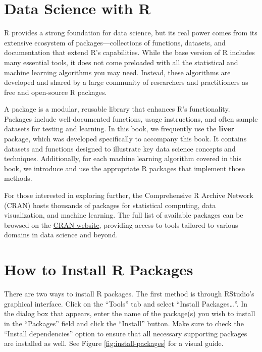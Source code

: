 \documentclass[
  11pt,
]{book}
\theoremstyle{definition}
\theoremstyle{definition}
\theoremstyle{definition}
\theoremstyle{definition}
\theoremstyle{remark}
\begin{document}
\section{Data Science with R}\label{data-science-with-r}

R provides a strong foundation for data science, but its real power comes from its extensive ecosystem of packages---collections of functions, datasets, and documentation that extend R's capabilities. While the base version of R includes many essential tools, it does not come preloaded with all the statistical and machine learning algorithms you may need. Instead, these algorithms are developed and shared by a large community of researchers and practitioners as free and open-source R packages.

A package is a modular, reusable library that enhances R's functionality. Packages include well-documented functions, usage instructions, and often sample datasets for testing and learning. In this book, we frequently use the \textbf{liver} package, which was developed specifically to accompany this book. It contains datasets and functions designed to illustrate key data science concepts and techniques. Additionally, for each machine learning algorithm covered in this book, we introduce and use the appropriate R packages that implement those methods.

For those interested in exploring further, the Comprehensive R Archive Network (CRAN) hosts thousands of packages for statistical computing, data visualization, and machine learning. The full list of available packages can be browsed on the \href{https://CRAN.R-project.org}{CRAN website}, providing access to tools tailored to various domains in data science and beyond.

\section{How to Install R Packages}\label{install-packages}

There are two ways to install R packages. The first method is through RStudio's graphical interface. Click on the ``Tools'' tab and select ``Install Packages\ldots{}''. In the dialog box that appears, enter the name of the package(s) you wish to install in the ``Packages'' field and click the ``Install'' button. Make sure to check the ``Install dependencies'' option to ensure that all necessary supporting packages are installed as well. See Figure \ref{fig:install-packages} for a visual guide.
\end{document}
